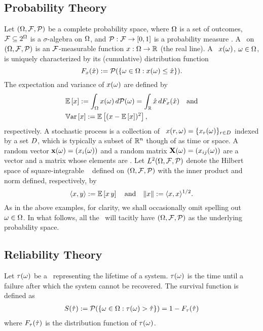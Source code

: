 \subsection{Probability Theory}
Let $(\Omega, \mathcal{F}, \mathcal{P})$ be a complete probability space, where $\Omega$ is a set of outcomes, $\mathcal{F} \subseteq 2^\Omega$ is a $\sigma$-algebra on $\Omega$, and $\mathcal{P}: \mathcal{F} \to [0, 1]$ is a probability measure \cite{durrett2010}.
A \rv\ on $(\Omega, \mathcal{F}, \mathcal{P})$ is an $\mathcal{F}$-measurable function $x: \Omega \to \mathbb{R}$ (the real line).
A \rv\ $x(\omega)$, $\omega \in \Omega$, is uniquely characterized by its (cumulative) distribution function
\begin{equation*}
  F_x(\hat{x}) := \mathcal{P}(\{ \omega \in \Omega: x(\omega) \leq \hat{x} \}).
\end{equation*}
The expectation and variance of $x(\omega)$ are defined by
\begin{align*}
  & \mathbb{E}\left[ x \right] := \int_\Omega x(\omega) \, d\mathcal{P}(\omega) = \int_{\mathbb{R}} \hat{x} \, d F_x(\hat{x}) \hspace{1em} \text{and} \\
  & \mathbb{V}\text{ar}\left[ x \right] := \mathbb{E}\left[ (x - \mathbb{E}\left[ x \right])^2 \right],
\end{align*}
respectively.
A stochastic process is a collection of \rvs\ $x(r, \omega) = \{ x_r(\omega) \}_{r \in D}$ indexed by a set $D$, which is typically a subset of $\mathbb{R}^n$ though of as time or space.
A random vector $\mathbf{x}(\omega) = (x_i(\omega))$ and a random matrix $\mathbf{X}(\omega) = (x_{ij}(\omega))$ are a vector and a matrix whose elements are \rvs.
Let $L^{2}(\Omega, \mathcal{F}, \mathcal{P})$ denote the Hilbert space of square-integrable \rvs\ \cite{janson1997} defined on $(\Omega, \mathcal{F}, \mathcal{P})$ with the inner product and norm defined, respectively, by
\begin{equation*}
  \langle x, y \rangle := \mathbb{E}\left[ x \, y \right] \hspace{1em} \text{and} \hspace{1em} \| x \| := \langle x, x \rangle^{1/2}.
\end{equation*}
As in the above examples, for clarity, we shall occasionally omit spelling out $\omega \in \Omega$.
In what follows, all the \rvs\ will tacitly have $(\Omega, \mathcal{F}, \mathcal{P})$ as the underlying probability space.

\subsection{Reliability Theory}
Let $\tau(\omega)$ be a \rv\ representing the lifetime of a system.
$\tau(\omega)$ is the time until a failure after which the system cannot be recovered.
The survival function is defined as
\begin{align*}
  S(\hat{\tau}) := \mathcal{P}(\{ \omega \in \Omega: \tau(\omega) > \hat{\tau} \}) = 1 - F_\tau(\hat{\tau})
\end{align*}
where $F_\tau(\hat{\tau})$ is the distribution function of $\tau(\omega)$.
